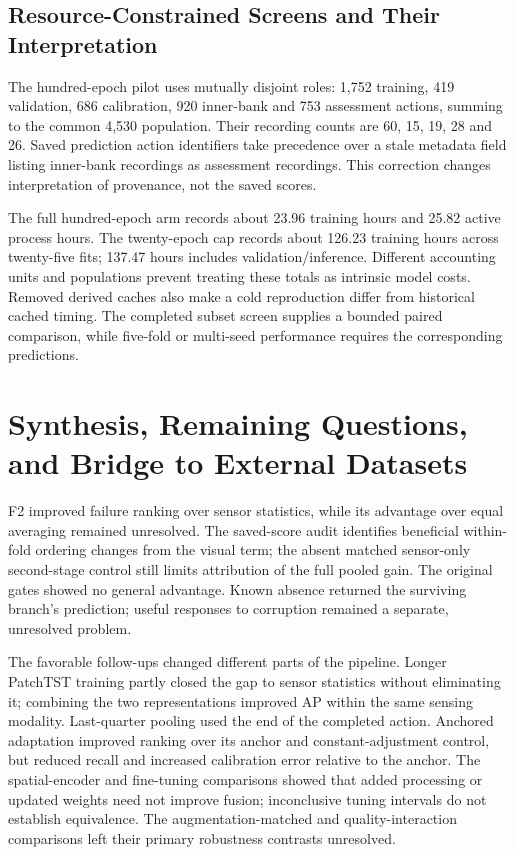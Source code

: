\subsection{Resource-Constrained Screens and Their Interpretation}
The hundred-epoch pilot uses mutually disjoint roles: 1,752 training, 419 validation,
686 calibration, 920 inner-bank and 753 assessment actions, summing to the common 4,530
population. Their recording counts are 60, 15, 19, 28 and 26. Saved prediction action
identifiers take precedence over a stale metadata field listing inner-bank recordings as
assessment recordings. This correction changes interpretation of provenance, not the
saved scores.

The full hundred-epoch arm records about 23.96 training hours and 25.82 active process
hours. The twenty-epoch cap records about 126.23 training hours across twenty-five fits;
137.47 hours includes validation/inference. Different accounting units and populations
prevent treating these totals as intrinsic model costs. Removed derived caches also make
a cold reproduction differ from historical cached timing. The completed subset screen
supplies a bounded paired comparison, while five-fold or multi-seed performance requires
the corresponding predictions.

\section{Synthesis, Remaining Questions, and Bridge to External Datasets}
F2 improved failure ranking over sensor statistics, while its advantage over equal
averaging remained unresolved. The saved-score audit identifies beneficial within-fold
ordering changes from the visual term; the absent matched sensor-only second-stage
control still limits attribution of the full pooled gain. The original gates showed no
general advantage. Known absence returned the surviving branch's prediction; useful
responses to corruption remained a separate, unresolved problem.

The favorable follow-ups changed different parts of the pipeline. Longer PatchTST
training partly closed the gap to sensor statistics without eliminating it; combining
the two representations improved AP within the same sensing modality. Last-quarter
pooling used the end of the completed action. Anchored adaptation improved ranking over
its anchor and constant-adjustment control, but reduced recall and increased calibration
error relative to the anchor. The spatial-encoder and fine-tuning comparisons showed
that added processing or updated weights need not improve fusion; inconclusive tuning
intervals do not establish equivalence. The augmentation-matched and quality-interaction
comparisons left their primary robustness contrasts unresolved.

